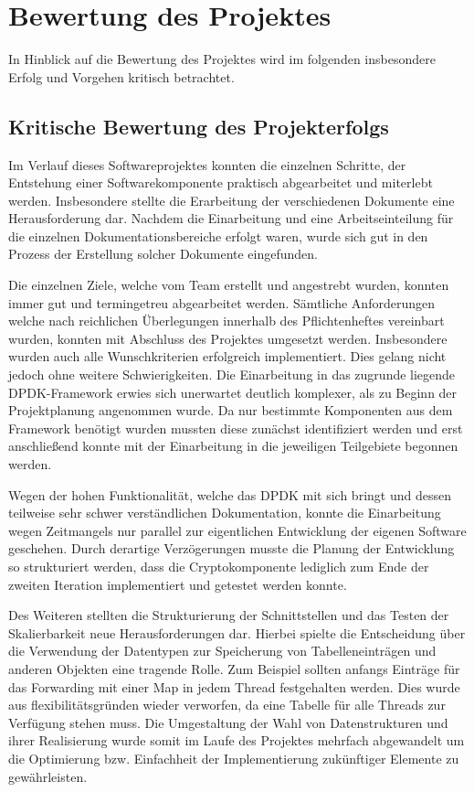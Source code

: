 \section{Bewertung des Projektes}
In Hinblick auf die Bewertung des Projektes wird im folgenden insbesondere Erfolg und Vorgehen kritisch betrachtet.

\subsection{Kritische Bewertung des Projekterfolgs}
Im Verlauf dieses Softwareprojektes konnten die einzelnen Schritte, der Entstehung einer Softwarekomponente praktisch abgearbeitet und miterlebt werden.
Insbesondere stellte die Erarbeitung der verschiedenen Dokumente eine Herausforderung dar.
Nachdem die Einarbeitung und eine Arbeitseinteilung für die einzelnen Dokumentationsbereiche erfolgt waren, wurde sich gut in den Prozess der Erstellung solcher Dokumente eingefunden.

Die einzelnen Ziele, welche vom Team erstellt und angestrebt wurden, konnten immer gut und termingetreu abgearbeitet werden.
Sämtliche Anforderungen welche nach reichlichen Überlegungen innerhalb des Pflichtenheftes vereinbart wurden, konnten mit Abschluss des Projektes umgesetzt werden. Insbesondere wurden auch alle Wunschkriterien erfolgreich implementiert. 
Dies gelang nicht jedoch ohne weitere Schwierigkeiten. 
Die Einarbeitung in das zugrunde liegende DPDK-Framework erwies sich unerwartet deutlich komplexer, als zu Beginn der Projektplanung angenommen wurde. 
Da nur bestimmte Komponenten aus dem Framework benötigt wurden mussten diese zunächst identifiziert werden und erst anschließend konnte mit der Einarbeitung in die jeweiligen Teilgebiete begonnen werden.

Wegen der hohen Funktionalität, welche das DPDK mit sich bringt und dessen teilweise sehr schwer verständlichen Dokumentation, konnte die Einarbeitung wegen Zeitmangels nur parallel zur eigentlichen Entwicklung der eigenen Software geschehen. 
Durch derartige Verzögerungen musste die Planung der Entwicklung so strukturiert werden, dass die Cryptokomponente lediglich zum Ende der zweiten Iteration implementiert und getestet werden konnte.

Des Weiteren stellten die Strukturierung der Schnittstellen und das Testen der Skalierbarkeit neue Herausforderungen dar.
Hierbei spielte die Entscheidung über die Verwendung der Datentypen zur Speicherung von Tabelleneinträgen und anderen Objekten eine tragende Rolle. 
Zum Beispiel sollten anfangs Einträge für das Forwarding mit einer Map in jedem Thread festgehalten werden. 
Dies wurde aus flexibilitätsgründen wieder verworfen, da eine Tabelle für alle Threads zur Verfügung stehen muss.
Die Umgestaltung der Wahl von Datenstrukturen und ihrer Realisierung wurde somit im Laufe des Projektes mehrfach abgewandelt um die Optimierung bzw. Einfachheit der Implementierung zukünftiger Elemente zu gewährleisten.

